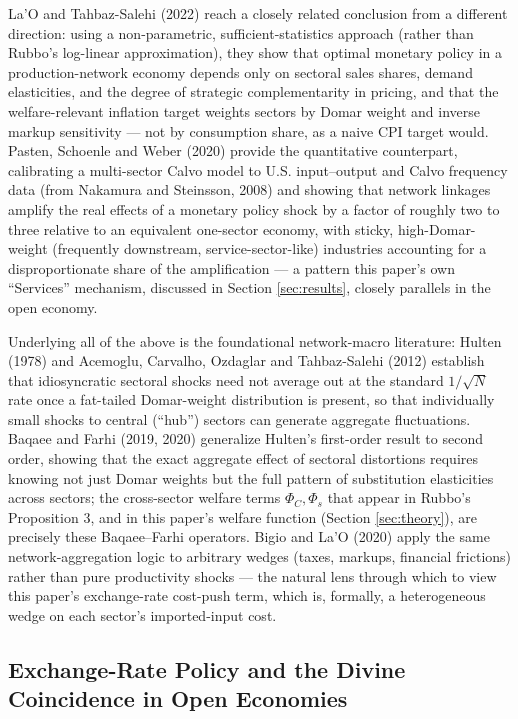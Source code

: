 \documentclass[12pt]{article}
\begin{document}
La'O and Tahbaz-Salehi (2022) reach a closely related conclusion from a different direction: using a
non-parametric, sufficient-statistics approach (rather than Rubbo's log-linear approximation), they
show that optimal monetary policy in a production-network economy depends only on sectoral sales
shares, demand elasticities, and the degree of strategic complementarity in pricing, and that the
welfare-relevant inflation target weights sectors by Domar weight and inverse markup sensitivity ---
not by consumption share, as a naive CPI target would. Pasten, Schoenle and Weber (2020) provide
the quantitative counterpart, calibrating a multi-sector Calvo model to U.S. input--output and Calvo
frequency data (from Nakamura and Steinsson, 2008) and showing that network linkages amplify the real
effects of a monetary policy shock by a factor of roughly two to three relative to an equivalent
one-sector economy, with sticky, high-Domar-weight (frequently downstream, service-sector-like)
industries accounting for a disproportionate share of the amplification --- a pattern this paper's
own ``Services'' mechanism, discussed in Section \ref{sec:results}, closely parallels in the open
economy.

Underlying all of the above is the foundational network-macro literature: Hulten (1978) and Acemoglu,
Carvalho, Ozdaglar and Tahbaz-Salehi (2012) establish that idiosyncratic sectoral shocks need not
average out at the standard $1/\sqrt N$ rate once a fat-tailed Domar-weight distribution is present,
so that individually small shocks to central (``hub'') sectors can generate aggregate fluctuations.
Baqaee and Farhi (2019, 2020) generalize Hulten's first-order result to second order, showing that
the exact aggregate effect of sectoral distortions requires knowing not just Domar weights but the
full pattern of substitution elasticities across sectors; the cross-sector welfare terms
$\Phi_C,\Phi_s$ that appear in Rubbo's Proposition 3, and in this paper's welfare function
(Section \ref{sec:theory}), are precisely these Baqaee--Farhi operators. Bigio and La'O (2020) apply
the same network-aggregation logic to arbitrary wedges (taxes, markups, financial frictions) rather
than pure productivity shocks --- the natural lens through which to view this paper's exchange-rate
cost-push term, which is, formally, a heterogeneous wedge on each sector's imported-input cost.

\subsection{Exchange-Rate Policy and the Divine Coincidence in Open Economies}
\end{document}
